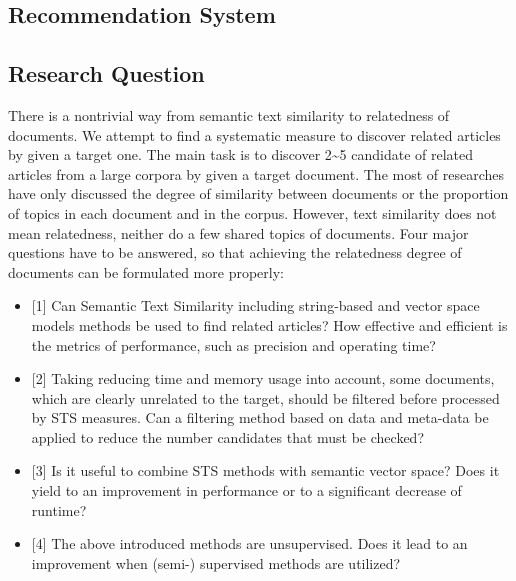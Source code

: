 \subsection{Recommendation System}

\subsection{Research Question}

There is a nontrivial way from semantic text similarity to relatedness of documents. We attempt to find a systematic measure to discover related articles by given a target one. The main task is to discover 2\textasciitilde 5 candidate of related articles from a large corpora by given a target document. The most of researches have only discussed the degree of similarity between documents or the proportion of topics in each document and in the corpus. However, text similarity does not mean relatedness, neither do a few shared topics of documents. Four major questions have to be answered, so that achieving the relatedness degree of documents can be formulated more properly: 

\begin{itemize}
    \item[1.] \label{q:1}[1] Can Semantic Text Similarity including string-based and vector space models methods be used to find related articles? How effective and efficient is the metrics of performance, such as precision and operating time?
    \item[2.] \label{q:2}[2] Taking reducing time and memory usage into account, some documents, which are clearly unrelated to the target, should be filtered before processed by STS measures.  Can a filtering method based on data and meta-data be applied to reduce the number candidates that must be checked?
    \item[3.] \label{q:3}[3] Is it useful to combine STS methods with semantic vector space? Does it yield to an improvement in performance or to a significant decrease of runtime?
    \item[4.] \label{q:4}[4] The above introduced methods are unsupervised. Does it lead to an improvement when (semi-) supervised methods are utilized?
\end{itemize}